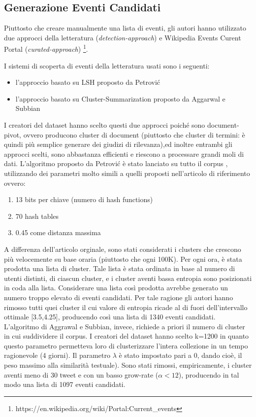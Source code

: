 \subsection{Generazione Eventi Candidati}
Piuttosto che creare manualmente una lista di eventi, gli autori hanno utilizzato due approcci della letteratura (\emph{detection-approach}) e Wikipedia Events Curent Portal (\emph{curated-approach}) \footnote{https://en.wikipedia.org/wiki/Portal:Current\_events}.

I sistemi di scoperta di eventi della letteratura usati sono i seguenti:
\begin{itemize}
\item l'approccio basato su LSH proposto da Petrovi\'c \cite{Petrovic:2010:SFS:1857999.1858020}
\item l'approccio basato su Cluster-Summarization proposto da Aggarwal e Subbian \cite{doi:10.1137/1.9781611972825.54}
\end{itemize}
I creatori del dataset hanno scelto questi due approcci poiché sono document-pivot, ovvero producono  cluster di document (piuttosto che cluster di termini: è quindi più semplice generare dei giudizi di rilevanza),ed inoltre entrambi gli approcci scelti, sono abbastanza efficienti e riescono a processare grandi moli di dati.
L'algoritmo proposto da Petrovi\'c è stato lanciato su tutto il  corpus , utilizzando dei parametri molto simili a quelli proposti nell'articolo di riferimento \cite{Petrovic:2010:SFS:1857999.1858020}
 ovvero: 
\begin{enumerate}
\item 13 bits per chiave (numero di hash functions)
\item 70 hash tables
\item 0.45 come distanza massima
\end{enumerate} 
A differenza dell'articolo orginale, sono stati considerati i clusters che crescono più velocemente su base oraria (piuttosto che ogni 100K). Per ogni ora, è stata prodotta una lista di cluster. Tale lista è stata ordinata in base al numero di utenti distinti, di ciascun cluster, e i cluster aventi bassa entropia sono posizionati in coda alla lista. Considerare una lista così prodotta avrebbe generato un numero troppo elevato di eventi candidati. Per tale ragione gli autori hanno rimosso tutti quei cluster il cui valore di entropia ricade al di fuori dell'intervallo ottimale [3.5,4.25]\cite{Petrovic:2010:SFS:1857999.1858020}, producendo così una lista di 1340 eventi candidati.
L'algoritmo di Aggrawal e Subbian, invece, richiede a priori il numero di cluster in cui suddividere il corpus. I creatori del dataset hanno scelto k=1200 in quanto questo parametro permetteva loro di clusterizzare l'intera collezione in un tempo ragionevole (4 giorni). Il parametro $\lambda$ è stato impostato pari a $0$, dando cioè, il peso massimo alla similarità testuale).
Sono stati rimossi, empiricamente, i cluster aventi meno di 30 tweet e con un basso grow-rate ($\alpha<12$), producendo in tal modo una lista di 1097 eventi candidati.

